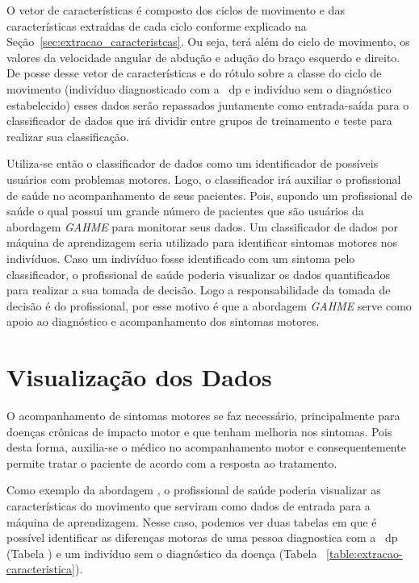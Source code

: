 O vetor de características é composto dos ciclos de movimento e das características extraídas de cada ciclo conforme explicado na Seção~\ref{sec:extracao_caracteristcas}. Ou seja, terá além do ciclo de movimento, os valores da velocidade angular de abdução e adução do braço esquerdo e direito. De posse desse vetor de características e do rótulo sobre a classe do ciclo de movimento (indivíduo diagnosticado com a ~\ac{dp} e indivíduo sem o diagnóstico estabelecido) esses dados serão repassados juntamente como entrada-saída para o classificador de dados que irá dividir entre grupos de treinamento e teste para realizar sua classificação.

Utiliza-se então o classificador de dados como um identificador de possíveis usuários com problemas motores. Logo, o classificador irá auxiliar o profissional de saúde no acompanhamento de seus pacientes. Pois, supondo um profissional de saúde o qual possui um grande número de pacientes que são usuários da abordagem \textit{GAHME} para monitorar seus dados. Um classificador de dados por máquina de aprendizagem seria utilizado para identificar sintomas motores nos indivíduos. Caso um indivíduo fosse identificado com um sintoma pelo classificador, o profissional de saúde poderia visualizar os dados quantificados para realizar a sua tomada de decisão. Logo a responsabilidade da tomada de decisão é do profissional, por esse motivo é que a abordagem \textit{GAHME} serve como apoio ao diagnóstico e acompanhamento dos sintomas motores.


\section{Visualização dos Dados}
O acompanhamento de sintomas motores se faz necessário, principalmente para doenças crônicas de impacto motor e que tenham melhoria nos sintomas. Pois desta forma, auxilia-se o médico no acompanhamento motor e consequentemente permite tratar o paciente de acordo com a resposta ao tratamento.

Como exemplo da abordagem , o profissional de saúde poderia visualizar as características do movimento que serviram como dados de entrada para a máquina de aprendizagem. Nesse caso, podemos ver duas tabelas em que é possível identificar as diferenças motoras de uma pessoa diagnostica com a ~\ac{dp} (Tabela \label{table:extracao_caracterisca_parkinsoniano}) e um indivíduo sem o diagnóstico da doença (Tabela ~\ref{table:extracao-caracteristica}).

